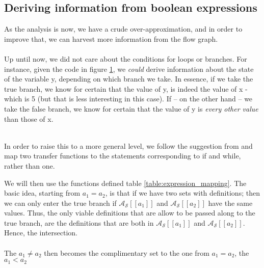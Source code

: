\subsection{Deriving information from boolean expressions}
As the analysis is now, we have a crude over-approximation, and in order to improve that, we can harvest more information from the flow graph.\\\\
Up until now, we did not care about the conditions for loops or branches. For instance, given the code in figure \ref{fig:if_flow_example}, we \emph{could} derive information about the state of the variable y, depending on which branch we take. In essence, if we take the true branch, we know for certain that the value of y, is indeed the value of x - which is 5 (but that is less interesting in this case). If -- on the other hand -- we take the false branch, we know for certain that the value of y is \emph{every other value} than those of x.\\\\
\begin{figure}[h]
\centering
{}
 \caption{}
 \label{fig:if_flow_example}
\end{figure} In order to raise this to a more general level, we follow the suggestion from \cite{02242_slides} and map two transfer functions to the statements corresponding to if and while, rather than one.


We will then use the functions defined table \ref{table:expression_mapping}. The basic idea, starting from $a_1 = a_2$, is that if we have two sets with definitions; then we can only enter the true branch if $\mathcal{A_S}[\![a_1]\!]$ and $\mathcal{A_S}[\![a_2]\!]$ have the same values. Thus, the only viable definitions that are allow to be passed along to the true branch, are the definitions that are both in $\mathcal{A_S}[\![a_1]\!]$ and $\mathcal{A_S}[\![a_2]\!]$. Hence, the intersection.\\\\
The $a_1 \neq a_2$ then becomes the complimentary set to the one from $a_1 = a_2$, the $a_1 < a_2$ %

